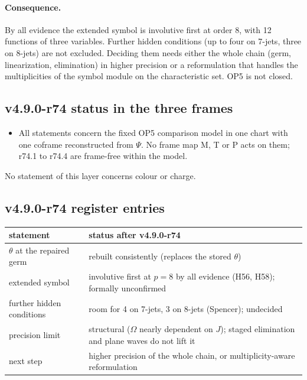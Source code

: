 \paragraph{Consequence.}
By all evidence the extended symbol is involutive first at order 8, with 12 functions of three variables.  Further hidden
conditions (up to four on 7-jets, three on 8-jets) are not excluded.  Deciding them needs either the whole chain (germ,
linearization, elimination) in higher precision or a reformulation that handles the multiplicities of the symbol module on the
characteristic set.  OP5 is not closed.

\subsection*{v4.9.0-r74 status in the three frames}
\label{subsec:v490-r74-frames}

\begin{itemize}[leftmargin=2em]
\item All statements concern the fixed OP5 comparison model in one chart with one coframe reconstructed from \(\Psi\).  No frame
map M, T or P acts on them; r74.1 to r74.4 are frame-free within the model.
\end{itemize}
No statement of this layer concerns colour or charge.

\subsection*{v4.9.0-r74 register entries}
\label{subsec:v490-r74-register}

\begin{center}
\small
\begin{tabular}{@{}>{\raggedright\arraybackslash}p{}>{\raggedright\arraybackslash}p{}@{}}
\toprule
statement & status after v4.9.0-r74\\
\midrule
\(\theta\) at the repaired germ & rebuilt consistently (replaces the stored \(\theta\))\\
extended symbol & involutive first at \(p=8\) by all evidence (H56, H58); formally unconfirmed\\
further hidden conditions & room for 4 on 7-jets, 3 on 8-jets (Spencer); undecided\\
precision limit & structural (\(\Omega\) nearly dependent on \(J\)); staged elimination and plane waves do not lift it\\
next step & higher precision of the whole chain, or multiplicity-aware reformulation\\
\bottomrule
\end{tabular}
\end{center}

